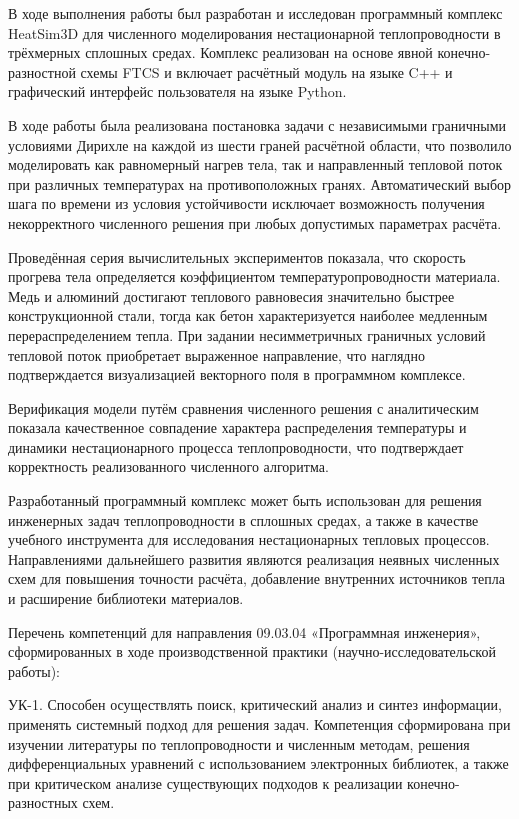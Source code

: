 
\conclusion
В ходе выполнения работы был разработан и исследован программный 
комплекс HeatSim3D для численного моделирования нестационарной 
теплопроводности в трёхмерных сплошных средах. Комплекс реализован 
на основе явной конечно-разностной схемы FTCS и включает расчётный 
модуль на языке C++ и графический интерфейс пользователя на языке 
Python.

В ходе работы была реализована постановка задачи с независимыми 
граничными условиями Дирихле на каждой из шести граней расчётной 
области, что позволило моделировать как равномерный нагрев тела, 
так и направленный тепловой поток при различных температурах на 
противоположных гранях. Автоматический выбор шага по времени из 
условия устойчивости исключает возможность получения некорректного 
численного решения при любых допустимых параметрах расчёта.

Проведённая серия вычислительных экспериментов показала, что 
скорость прогрева тела определяется коэффициентом 
температуропроводности материала. Медь и алюминий достигают 
теплового равновесия значительно быстрее конструкционной стали, 
тогда как бетон характеризуется наиболее медленным 
перераспределением тепла. При задании несимметричных граничных 
условий тепловой поток приобретает выраженное направление, что 
наглядно подтверждается визуализацией векторного поля в 
программном комплексе.

Верификация модели путём сравнения численного решения с 
аналитическим показала качественное совпадение характера 
распределения температуры и динамики нестационарного процесса 
теплопроводности, что подтверждает корректность реализованного 
численного алгоритма.

Разработанный программный комплекс может быть использован для 
решения инженерных задач теплопроводности в сплошных средах, 
а также в качестве учебного инструмента для исследования 
нестационарных тепловых процессов. Направлениями дальнейшего 
развития являются реализация неявных численных схем для 
повышения точности расчёта, добавление внутренних источников 
тепла и расширение библиотеки материалов.


Перечень компетенций для направления 09.03.04 «Программная инженерия», сформированных в ходе производственной практики (научно-исследовательской работы):

УК-1. Способен осуществлять поиск, критический анализ и синтез 
информации, применять системный подход для решения задач. 
Компетенция сформирована при изучении литературы по теплопроводности 
и численным методам, решения дифференциальных уравнений с использованием 
электронных библиотек, а также при критическом анализе существующих 
подходов к реализации конечно-разностных схем.

